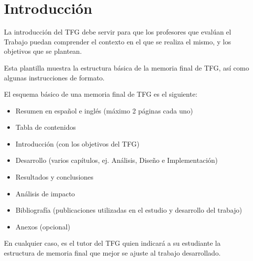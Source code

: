 \chapter{Introducción}
\label{ch:intro}

La introducción del TFG debe servir para que los profesores que evalúan el Trabajo puedan comprender el contexto en el que se realiza el mismo, y los objetivos que se plantean.

Esta plantilla muestra la estructura básica de la memoria final de TFG, así como algunas instrucciones de formato.

El esquema básico de una memoria final de TFG es el siguiente:
\begin{itemize}
\item Resumen en español e inglés (máximo 2 páginas cada uno)
\item Tabla de contenidos
\item Introducción (con los objetivos del TFG)
\item Desarrollo (varios capítulos, ej. Análisis, Diseño e Implementación)
\item Resultados y conclusiones
\item Análisis de impacto
\item Bibliografía (publicaciones utilizadas en el estudio y desarrollo del trabajo)
\item Anexos (opcional)
\end{itemize}

En cualquier caso, es el tutor del TFG quien indicará a su estudiante la estructura de memoria final que mejor se ajuste al trabajo desarrollado.


